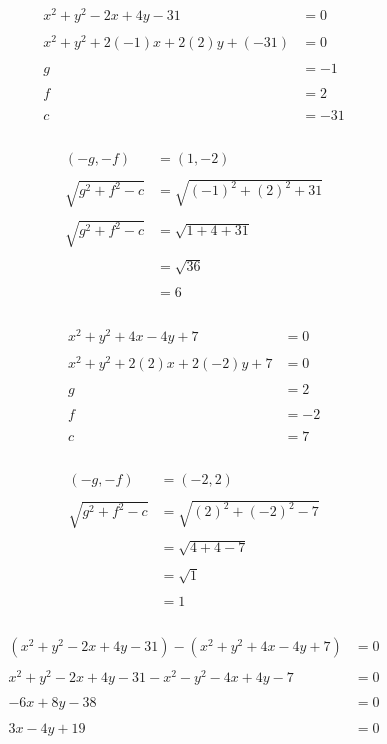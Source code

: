 \documentclass{article}
\begin{document}
\begin{align*}
	x^2+y^2-2x+4y-31&=0\\
	\\
	x^2+y^2+2(-1)x+2(2)y+(-31)&=0\\
	\\
	g&=-1\\
	\\
	f&=2\\
	\\
	c&=-31\\
\end{align*}
\\
\begin{align*}
	(-g,-f)&=(1,-2)\\
	\\
	\sqrt{g^2+f^2-c}&=\sqrt{(-1)^2+(2)^2+31}\\
	\\
	\sqrt{g^2+f^2-c}&=\sqrt{1+4+31}\\
	\\
	&=\sqrt{36}\\
	\\
	&=6\\
\end{align*}
\\
\begin{align*}
	x^2+y^2+4x-4y+7&=0\\
	\\
	x^2+y^2+2(2)x+2(-2)y+7&=0\\
	\\
	g&=2\\
	\\
	f&=-2\\
	\\
	c&=7\\
\end{align*}
\\
\begin{align*}
	(-g,-f)&=(-2,2)\\
	\\
	\sqrt{g^2+f^2-c}&=\sqrt{(2)^2+(-2)^2-7}\\
	\\
	&=\sqrt{4+4-7}\\
	\\
	&=\sqrt{1}\\
	\\
	&=1\\
\end{align*}
\\
\begin{align*}
	(x^2+y^2-2x+4y-31)-(x^2+y^2+4x-4y+7)&=0\\
	\\
	x^2+y^2-2x+4y-31-x^2-y^2-4x+4y-7&=0\\
	\\
	-6x+8y-38&=0\\
	\\
	3x-4y+19&=0\\
\end{align*}
\end{document}

